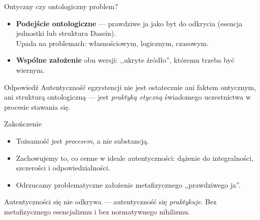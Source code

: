 \documentclass{beamer}
\begin{document}
\begin{frame}{Ontyczny czy ontologiczny problem?}
  \begin{itemize}
    \item \textbf{Podejście ontologiczne} --- prawdziwe ja jako byt do odkrycia
          (esencja jednostki lub struktura Dasein). \\
          \footnotesize Upada na problemach: własnościowym, logicznym, czasowym.
    \item \normalsize \textbf{Wspólne założenie} obu wersji: ,,ukryte źródło'',
          któremu trzeba być wiernym.
  \end{itemize}
  \vspace{0.5em}
  \begin{block}{Odpowiedź}
    Autentyczność egzystencji nie jest ostatecznie ani faktem ontycznym,
    ani strukturą ontologiczną --- jest \emph{praktyką etyczną}
    świadomego uczestnictwa w procesie stawania się.
  \end{block}
\end{frame}
 
\begin{frame}{Zakończenie}
  \begin{itemize}
    \item Tożsamość jest \emph{procesem}, a nie substancją.
    \item Zachowujemy to, co cenne w ideale autentyczności: dążenie do
          integralności, szczerości i odpowiedzialności.
    \item Odrzucamy problematyczne założenie metafizycznego ,,prawdziwego ja''.
  \end{itemize}
  \vspace{0.5em}
  \begin{block}{}
    Autentyczności się nie odkrywa --- autentyczność się \emph{praktykuje}.
    Bez metafizycznego esencjalizmu i bez normatywnego nihilizmu.
  \end{block}
\end{frame}
 
\end{document}
